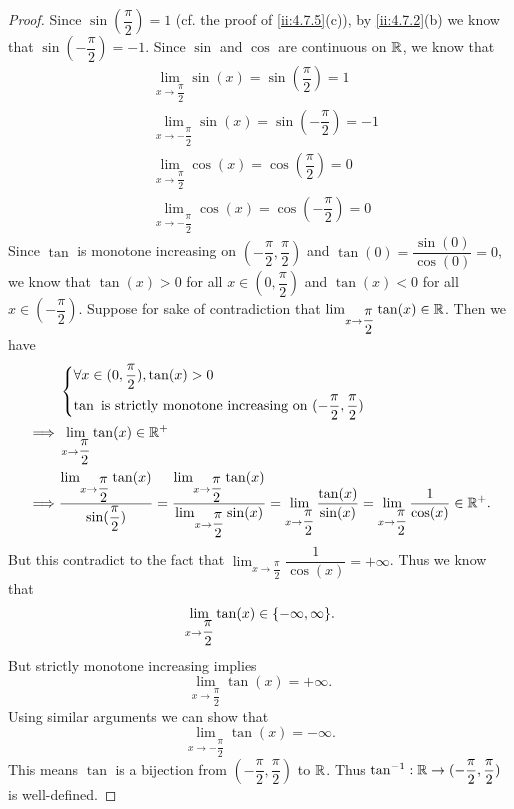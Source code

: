 \begin{proof}
  Since \(\sin(\dfrac{\pi}{2}) = 1\) (cf. the proof of \cref{ii:4.7.5}(c)), by \cref{ii:4.7.2}(b) we know that \(\sin(-\dfrac{\pi}{2}) = -1\).
  Since \(\sin\) and \(\cos\) are continuous on \(\mathbb{R}\), we know that
  \begin{align*}
     & \lim_{x \to \dfrac{\pi}{2}} \sin(x) = \sin(\dfrac{\pi}{2}) = 1    \\
     & \lim_{x \to -\dfrac{\pi}{2}} \sin(x) = \sin(-\dfrac{\pi}{2}) = -1 \\
     & \lim_{x \to \dfrac{\pi}{2}} \cos(x) = \cos(\dfrac{\pi}{2}) = 0    \\
     & \lim_{x \to -\dfrac{\pi}{2}} \cos(x) = \cos(-\dfrac{\pi}{2}) = 0
  \end{align*}
  Since \(\tan\) is monotone increasing on \((-\dfrac{\pi}{2}, \dfrac{\pi}{2})\) and \(\tan(0) = \dfrac{\sin(0)}{\cos(0)} = 0\), we know that \(\tan(x) > 0\) for all \(x \in (0, \dfrac{\pi}{2})\) and \(\tan(x) < 0\) for all \(x \in (-\dfrac{\pi}{2})\).
  Suppose for sake of contradiction that \(\lim_{x \to \dfrac{\pi}{2}} \tan(x) \in \mathbb{R}\).
  Then we have
  \begin{align*}
             & \begin{dcases}
                 \forall x \in (0, \dfrac{\pi}{2}), \tan(x) > 0 \\
                 \tan \text{ is strictly monotone increasing on } (-\dfrac{\pi}{2}, \dfrac{\pi}{2})
               \end{dcases}                                                                                                                                                                                      \\
    \implies & \lim_{x \to \dfrac{\pi}{2}} \tan(x) \in \mathbb{R}^+                                                                                                                                                                                                                           \\
    \implies & \dfrac{\lim_{x \to \dfrac{\pi}{2}} \tan(x)}{\sin(\dfrac{\pi}{2})} = \dfrac{\lim_{x \to \dfrac{\pi}{2}} \tan(x)}{\lim_{x \to \dfrac{\pi}{2}} \sin(x)} = \lim_{x \to \dfrac{\pi}{2}} \dfrac{\tan(x)}{\sin(x)} = \lim_{x \to \dfrac{\pi}{2}} \dfrac{1}{\cos(x)} \in \mathbb{R}^+.
  \end{align*}
  But this contradict to the fact that \(\lim_{x \to \dfrac{\pi}{2}} \dfrac{1}{\cos(x)} = +\infty\).
  Thus we know that
  \[
    \lim_{x \to \dfrac{\pi}{2}} \tan(x) \in \set{-\infty, \infty}.
  \]
  But strictly monotone increasing implies
  \[
    \lim_{x \to \dfrac{\pi}{2}} \tan(x) = +\infty.
  \]
  Using similar arguments we can show that
  \[
    \lim_{x \to -\dfrac{\pi}{2}} \tan(x) = -\infty.
  \]
  This means \(\tan\) is a bijection from \((-\dfrac{\pi}{2}, \dfrac{\pi}{2})\) to \(\mathbb{R}\).
  Thus \(\tan^{-1} : \mathbb{R} \to (-\dfrac{\pi}{2}, \dfrac{\pi}{2})\) is well-defined.


\end{proof}
